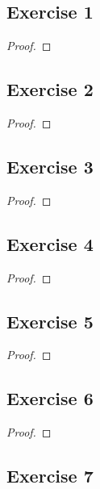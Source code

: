 \documentclass[14pt]{extarticle}
\begin{document}
\subsection{Exercise 1}

\begin{proof}

\end{proof}

\subsection{Exercise 2}

\begin{proof}

\end{proof}

\subsection{Exercise 3}

\begin{proof}

\end{proof}

\subsection{Exercise 4}

\begin{proof}

\end{proof}

\subsection{Exercise 5}

\begin{proof}

\end{proof}

\subsection{Exercise 6}

\begin{proof}

\end{proof}

\subsection{Exercise 7}
\end{document}
